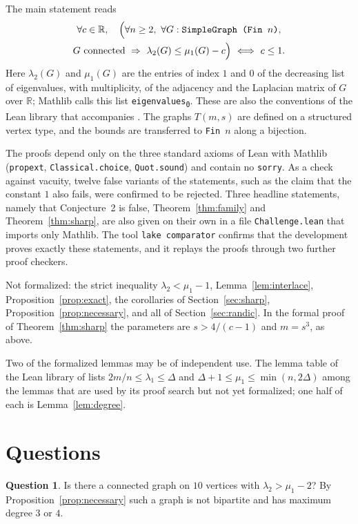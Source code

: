 \documentclass[11pt]{amsart}
\theoremstyle{definition}
\newtheorem{question}[theorem]{Question}
\theoremstyle{remark}
\newcommand{\R}{\mathbb{R}}
\newcommand{\lean}[1]{\texttt{#1}}
\begin{document}
The main statement reads
\begin{multline*}
\forall c\in\R,\quad\Bigl(\forall n\ge2,\ \forall G:\texttt{SimpleGraph (Fin }n\texttt{)},\\
G\ \text{connected}\ \Rightarrow\ \lambda_2(G)\le\mu_1(G)-c\Bigr)\ \Longleftrightarrow\ c\le1 .
\end{multline*}
Here $\lambda_2(G)$ and $\mu_1(G)$ are the entries of index $1$ and $0$ of the decreasing list
of eigenvalues, with multiplicity, of the adjacency and the Laplacian matrix of $G$ over $\R$;
Mathlib calls this list \lean{eigenvalues\textsubscript{0}}. These are also the conventions of
the Lean library that accompanies \cite{Cazenave}. The graphs $T(m,s)$ are defined on a
structured vertex type, and the bounds are transferred to \texttt{Fin}~$n$ along a bijection.

The proofs depend only on the three standard axioms of Lean with Mathlib
(\lean{propext}, \lean{Classical.choice}, \lean{Quot.sound}) and contain no \lean{sorry}. As a
check against vacuity, twelve false variants of the statements, such as the claim that the
constant $1$ also fails, were confirmed to be rejected. Three headline
statements, namely that Conjecture~2 is false, Theorem~\ref{thm:family} and
Theorem~\ref{thm:sharp}, are also given on their own in a file \texttt{Challenge.lean} that
imports only Mathlib. The tool \texttt{lake comparator} confirms that the development proves
exactly these statements, and it replays the proofs through two further proof checkers.

Not formalized: the strict inequality $\lambda_2<\mu_1-1$, Lemma~\ref{lem:interlace},
Proposition~\ref{prop:exact}, the corollaries of Section~\ref{sec:sharp},
Proposition~\ref{prop:necessary}, and all of Section~\ref{sec:randic}. In the formal proof of
Theorem~\ref{thm:sharp} the parameters are $s>4/(c-1)$ and $m=s^3$, as above.

Two of the formalized lemmas may be of independent use. The lemma table of the Lean library of
\cite{Cazenave} lists $2m/n\le\lambda_1\le\Delta$ and
$\Delta+1\le\mu_1\le\min(n,2\Delta)$ among the lemmas that are used by its proof search but not
yet formalized; one half of each is Lemma~\ref{lem:degree}.

\section{Questions}\label{sec:questions}

\begin{question}
Is there a connected graph on $10$ vertices with $\lambda_2>\mu_1-2$? By
Proposition~\ref{prop:necessary} such a graph is not bipartite and has maximum degree $3$ or
$4$.
\end{question}
\end{document}
